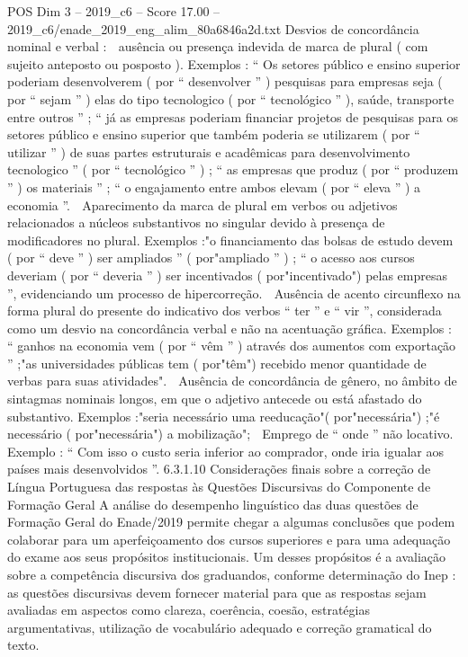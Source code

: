 \begin{textsample}{POS Dim 3 – 2019\_c6 – Score 17.00 – 2019\_c6/enade\_2019\_eng\_alim\_80a6846a2d.txt}
Desvios de concordância nominal e verbal :  ausência ou presença indevida de marca de plural ( com sujeito anteposto ou posposto ).
Exemplos : “ Os setores público e ensino superior poderiam desenvolverem ( por “ desenvolver ” ) pesquisas para empresas seja ( por “ sejam ” ) elas do tipo tecnologico ( por “ tecnológico ” ), saúde, transporte entre outros ” ; “ já as empresas poderiam financiar projetos de pesquisas para os setores público e ensino superior que também poderia se utilizarem ( por “ utilizar ” ) de suas partes estruturais e acadêmicas para desenvolvimento tecnologico ” ( por “ tecnológico ” ) ; “ as empresas que produz ( por “ produzem ” ) os materiais ” ; “ o engajamento entre ambos elevam ( por “ eleva ” ) a economia ”.  Aparecimento da marca de plural em verbos ou adjetivos relacionados a núcleos substantivos no singular devido à presença de modificadores no plural.
Exemplos :"o financiamento das bolsas de estudo devem ( por “ deve ” ) ser ampliados ” ( por"ampliado ” ) ; “ o acesso aos cursos deveriam ( por “ deveria ” ) ser incentivados ( por"incentivado") pelas empresas ”, evidenciando um processo de hipercorreção.  Ausência de acento circunflexo na forma plural do presente do indicativo dos verbos “ ter ” e “ vir ”, considerada como um desvio na concordância verbal e não na acentuação gráfica.
Exemplos : “ ganhos na economia vem ( por “ vêm ” ) através dos aumentos com exportação ” ;"as universidades públicas tem ( por"têm") recebido menor quantidade de verbas para suas atividades".  Ausência de concordância de gênero, no âmbito de sintagmas nominais longos, em que o adjetivo antecede ou está afastado do substantivo.
Exemplos :"seria necessário uma reeducação"( por"necessária") ;"é necessário ( por"necessária") a mobilização";  Emprego de “ onde ” não locativo.
Exemplo : “ Com isso o custo seria inferior ao comprador, onde iria igualar aos países mais desenvolvidos ”. 6.3.1.10 Considerações finais sobre a correção de Língua Portuguesa das respostas às Questões Discursivas do Componente de Formação Geral A análise do desempenho linguístico das duas questões de Formação Geral do Enade/2019 permite chegar a algumas conclusões que podem colaborar para um aperfeiçoamento dos cursos superiores e para uma adequação do exame aos seus propósitos institucionais.
Um desses propósitos é a avaliação sobre a competência discursiva dos graduandos, conforme determinação do Inep : as questões discursivas devem fornecer material para que as respostas sejam avaliadas em aspectos como clareza, coerência, coesão, estratégias argumentativas, utilização de vocabulário adequado e correção gramatical do texto.

\end{textsample}
